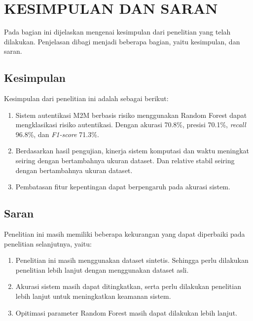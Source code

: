 \chapter{KESIMPULAN DAN SARAN}
Pada bagian ini dijelaskan mengenai kesimpulan dari penelitian yang telah dilakukan. Penjelasan dibagi menjadi beberapa bagian, yaitu kesimpulan, dan saran.

\section{Kesimpulan}
Kesimpulan dari penelitian ini adalah sebagai berikut:
\begin{enumerate}
    \item Sistem autentikasi M2M berbasis risiko menggunakan Random Forest dapat mengklasikasi risiko autentikasi. Dengan akurasi 70.8\%, presisi 70.1\%, \textit{recall} 96.8\%, dan \textit{F1-score} 71.3\%.
    \item Berdasarkan hasil pengujian, kinerja sistem komputasi dan waktu meningkat seiring dengan bertambahnya ukuran dataset. Dan relative stabil seiring dengan bertambahnya ukuran dataset.
    \item Pembatasan fitur kepentingan dapat berpengaruh pada akurasi sistem.
\end{enumerate}


\section{Saran}
Penelitian ini masih memiliki beberapa kekurangan yang dapat diperbaiki pada penelitian selanjutnya, yaitu:
\begin{enumerate}
    \item Penelitian ini masih menggunakan dataset sintetis. Sehingga perlu dilakukan penelitian lebih lanjut dengan menggunakan dataset asli.
    \item Akurasi sistem masih dapat ditingkatkan, serta perlu dilakukan penelitian lebih lanjut untuk meningkatkan keamanan sistem.
    \item Opitimasi parameter Random Forest masih dapat dilakukan lebih lanjut.
\end{enumerate}
